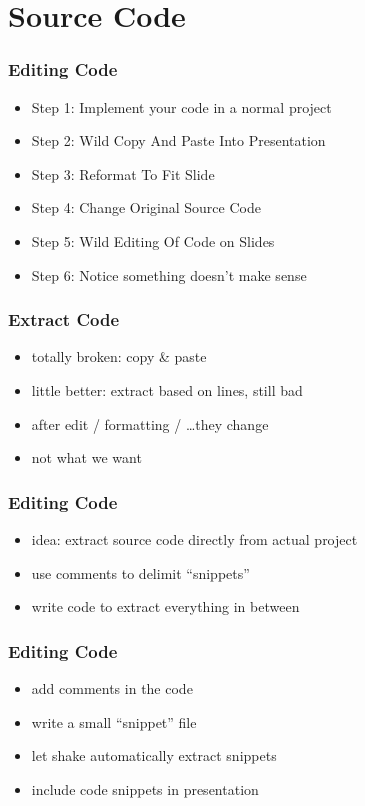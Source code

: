 \documentclass{beamer}
\begin{document}
\section{Source Code}

\begin{frame}
  \frametitle{Editing Code}
  \begin{itemize}
  \item Step 1: Implement your code in a normal project
  \item Step 2: Wild Copy And Paste Into Presentation
  \item Step 3: Reformat To Fit Slide
  \item Step 4: Change Original Source Code
  \item Step 5: Wild Editing Of Code on Slides
  \item Step 6: Notice something doesn't make sense
  \end{itemize}
\end{frame}

\begin{frame}[fragile]
  \frametitle{Extract Code}
  \begin{itemize}
  \item totally broken: copy \& paste
  \item little better: extract based on lines, still bad
  \item after edit / formatting / \ldots they change
  \item not what we want
  \end{itemize}
\end{frame}

\begin{frame}
  \frametitle{Editing Code}
  \begin{itemize}
  \item idea: extract source code directly from actual project
  \item use comments to delimit ``snippets''
  \item write code to extract everything in between
  \end{itemize}
\end{frame}

\begin{frame}
  \frametitle{Editing Code}
  \begin{itemize}
  \item add comments in the code
  \item write a small ``snippet'' file
  \item let shake automatically extract snippets
  \item include code snippets in presentation
  \end{itemize}
\end{frame}
\end{document}
